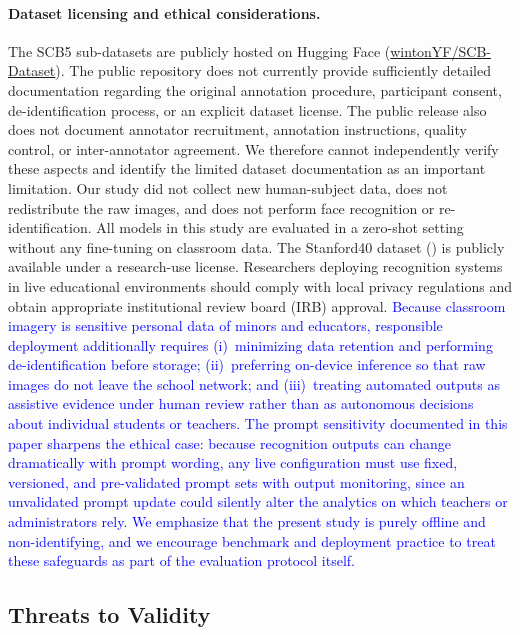 \documentclass[symmetry,article,submit,pdftex,moreauthors]{Definitions/mdpi}
\newcommand{\rev}[1]{\textcolor{blue}{#1}}
\begin{document}
\paragraph{Dataset licensing and ethical considerations.}
The SCB5 sub-datasets are publicly hosted on Hugging Face (\href{https://huggingface.co/datasets/wintonYF/SCB-Dataset}{wintonYF/SCB-Dataset}). The public repository does not currently provide sufficiently detailed documentation regarding the original annotation procedure, participant consent, de-identification process, or an explicit dataset license. The public release also does not document annotator recruitment, annotation instructions, quality control, or inter-annotator agreement. We therefore cannot independently verify these aspects and identify the limited dataset documentation as an important limitation. Our study did not collect new human-subject data, does not redistribute the raw images, and does not perform face recognition or re-identification. All models in this study are evaluated in a zero-shot setting without any fine-tuning on classroom data. The Stanford40 dataset () is publicly available under a research-use license. Researchers deploying recognition systems in live educational environments should comply with local privacy regulations and obtain appropriate institutional review board (IRB) approval. \rev{Because classroom imagery is sensitive personal data of minors and educators, responsible deployment additionally requires (i)~minimizing data retention and performing de-identification before storage; (ii)~preferring on-device inference so that raw images do not leave the school network; and (iii)~treating automated outputs as assistive evidence under human review rather than as autonomous decisions about individual students or teachers. The prompt sensitivity documented in this paper sharpens the ethical case: because recognition outputs can change dramatically with prompt wording, any live configuration must use fixed, versioned, and pre-validated prompt sets with output monitoring, since an unvalidated prompt update could silently alter the analytics on which teachers or administrators rely. We emphasize that the present study is purely offline and non-identifying, and we encourage benchmark and deployment practice to treat these safeguards as part of the evaluation protocol itself.}

\subsection{Threats to Validity}
\label{sec:threats_validity}
\end{document}
